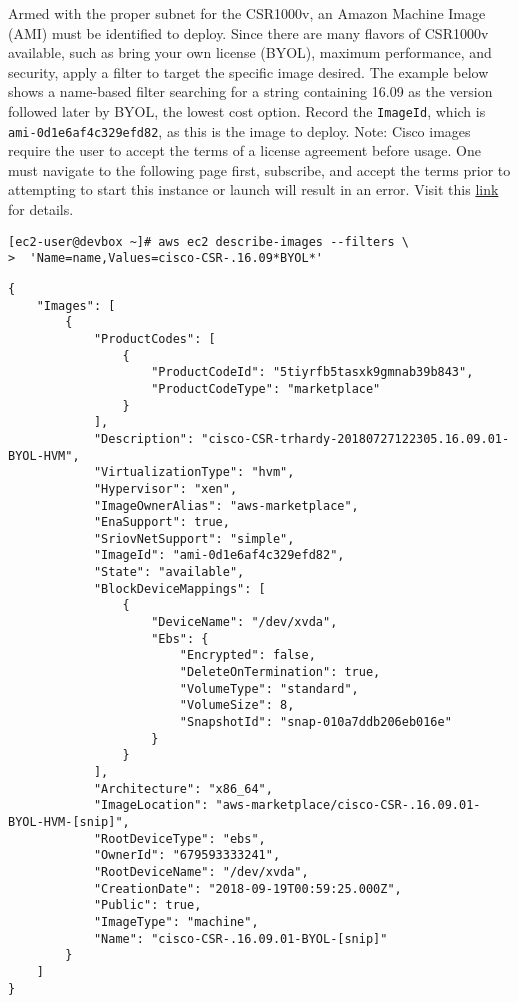 Armed with the proper subnet for the CSR1000v, an Amazon Machine Image (AMI)
must be identified to deploy. Since there are many flavors of CSR1000v
available, such as bring your own license (BYOL), maximum performance, and
security, apply a filter to target the specific image desired. The example
below shows a name-based filter searching for a string containing 16.09 as the
version followed later by BYOL, the lowest cost option. Record the \verb|ImageId|,
which is \verb|ami-0d1e6af4c329efd82|, as this is the image to deploy.
Note: Cisco images require the user to accept the terms of a license agreement
before usage. One must navigate to the following page first,
subscribe, and accept the terms prior to attempting to start this instance or
launch will result in an error. Visit this
\href{https://aws.amazon.com/marketplace/pp/B00NF48FI2}{link} for details.

\begin{verbatim}
[ec2-user@devbox ~]# aws ec2 describe-images --filters \
>  'Name=name,Values=cisco-CSR-.16.09*BYOL*'
\end{verbatim}

\begin{verbatim}
{
    "Images": [
        {
            "ProductCodes": [
                {
                    "ProductCodeId": "5tiyrfb5tasxk9gmnab39b843", 
                    "ProductCodeType": "marketplace"
                }
            ], 
            "Description": "cisco-CSR-trhardy-20180727122305.16.09.01-BYOL-HVM", 
            "VirtualizationType": "hvm", 
            "Hypervisor": "xen", 
            "ImageOwnerAlias": "aws-marketplace", 
            "EnaSupport": true, 
            "SriovNetSupport": "simple", 
            "ImageId": "ami-0d1e6af4c329efd82", 
            "State": "available", 
            "BlockDeviceMappings": [
                {
                    "DeviceName": "/dev/xvda", 
                    "Ebs": {
                        "Encrypted": false, 
                        "DeleteOnTermination": true, 
                        "VolumeType": "standard", 
                        "VolumeSize": 8, 
                        "SnapshotId": "snap-010a7ddb206eb016e"
                    }
                }
            ], 
            "Architecture": "x86_64", 
            "ImageLocation": "aws-marketplace/cisco-CSR-.16.09.01-BYOL-HVM-[snip]", 
            "RootDeviceType": "ebs", 
            "OwnerId": "679593333241", 
            "RootDeviceName": "/dev/xvda", 
            "CreationDate": "2018-09-19T00:59:25.000Z", 
            "Public": true, 
            "ImageType": "machine", 
            "Name": "cisco-CSR-.16.09.01-BYOL-[snip]"
        }
    ]
}
\end{verbatim}

